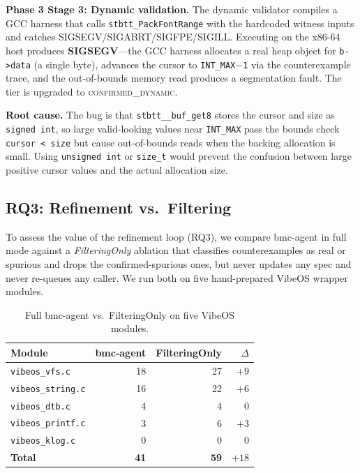 \documentclass[11pt,a4paper]{article}
\newcommand{\tool}{bmc-agent\xspace}
\newcommand{\vibeos}{VibeOS\xspace}
\newcommand{\dynconf}{\textsc{confirmed\_dynamic}\xspace}
\begin{document}
\smallskip\noindent\textbf{Phase 3 Stage 3: Dynamic validation.}
The dynamic validator compiles a GCC harness that calls
\texttt{stbtt\_PackFontRange} with the hardcoded witness inputs and catches
SIGSEGV/SIGABRT/SIGFPE/SIGILL. Executing on the x86-64 host produces
\textbf{SIGSEGV}---the GCC harness allocates a real heap object for \texttt{b->data}
(a single byte), advances the cursor to \texttt{INT\_MAX$-$1} via the
counterexample trace, and the out-of-bounds memory read produces a
segmentation fault. The tier is upgraded to \dynconf.

\smallskip\noindent\textbf{Root cause.}
The bug is that \texttt{stbtt\_\_buf\_get8} stores the cursor and size as
\texttt{signed int}, so large valid-looking values near \texttt{INT\_MAX}
pass the bounds check \texttt{cursor < size} but cause out-of-bounds
reads when the backing allocation is small. Using \texttt{unsigned int}
or \texttt{size\_t} would prevent the confusion between large positive
cursor values and the actual allocation size.

\subsection{RQ3: Refinement vs.\ Filtering}

To assess the value of the refinement loop (RQ3), we compare \tool in full
mode against a \emph{FilteringOnly} ablation that classifies counterexamples
as real or spurious and drops the confirmed-spurious ones, but never updates
any spec and never re-queues any caller. We run both on five hand-prepared
\vibeos wrapper modules.

\begin{table}[t]
\caption{Full \tool vs.\ FilteringOnly on five \vibeos modules.}
\label{tab:ablation}
\small
\begin{tabular}{lrrr}
\toprule
\textbf{Module} & \textbf{\tool} & \textbf{FilteringOnly} & \textbf{$\Delta$} \\
\midrule
\texttt{vibeos\_vfs.c}    & 18 & 27 & $+9$ \\
\texttt{vibeos\_string.c} & 16 & 22 & $+6$ \\
\texttt{vibeos\_dtb.c}    &  4 &  4 & $\phantom{+}0$ \\
\texttt{vibeos\_printf.c} &  3 &  6 & $+3$ \\
\texttt{vibeos\_klog.c}   &  0 &  0 & $\phantom{+}0$ \\
\midrule
\textbf{Total}            & \textbf{41} & \textbf{59} & $+18$ \\
\bottomrule
\end{tabular}
\end{table}
\end{document}
